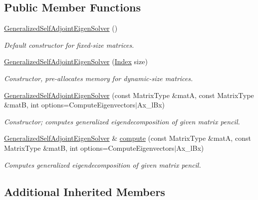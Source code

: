 \subsection*{Public Member Functions}
\begin{DoxyCompactItemize}
\item 
\mbox{\hyperlink{class_eigen_1_1_generalized_self_adjoint_eigen_solver_a501effdbf722c0609ea05ff3fd4cc721}{Generalized\+Self\+Adjoint\+Eigen\+Solver}} ()
\begin{DoxyCompactList}\small\item\em Default constructor for fixed-\/size matrices. \end{DoxyCompactList}\item 
\mbox{\hyperlink{class_eigen_1_1_generalized_self_adjoint_eigen_solver_aac849f01a8c6148c645acd10bd3a9b0e}{Generalized\+Self\+Adjoint\+Eigen\+Solver}} (\mbox{\hyperlink{class_eigen_1_1_self_adjoint_eigen_solver_a8a59ab7734b6eae2754fd78bc7c3a360}{Index}} size)
\begin{DoxyCompactList}\small\item\em Constructor, pre-\/allocates memory for dynamic-\/size matrices. \end{DoxyCompactList}\item 
\mbox{\hyperlink{class_eigen_1_1_generalized_self_adjoint_eigen_solver_addc0409c9cb1a5ac9cbbd00efe68908e}{Generalized\+Self\+Adjoint\+Eigen\+Solver}} (const Matrix\+Type \&matA, const Matrix\+Type \&matB, int options=Compute\+Eigenvectors$\vert$Ax\+\_\+l\+Bx)
\begin{DoxyCompactList}\small\item\em Constructor; computes generalized eigendecomposition of given matrix pencil. \end{DoxyCompactList}\item 
\mbox{\hyperlink{class_eigen_1_1_generalized_self_adjoint_eigen_solver}{Generalized\+Self\+Adjoint\+Eigen\+Solver}} \& \mbox{\hyperlink{class_eigen_1_1_generalized_self_adjoint_eigen_solver_a724764fe196612b752042692156ed023}{compute}} (const Matrix\+Type \&matA, const Matrix\+Type \&matB, int options=Compute\+Eigenvectors$\vert$Ax\+\_\+l\+Bx)
\begin{DoxyCompactList}\small\item\em Computes generalized eigendecomposition of given matrix pencil. \end{DoxyCompactList}\end{DoxyCompactItemize}
\subsection*{Additional Inherited Members}


